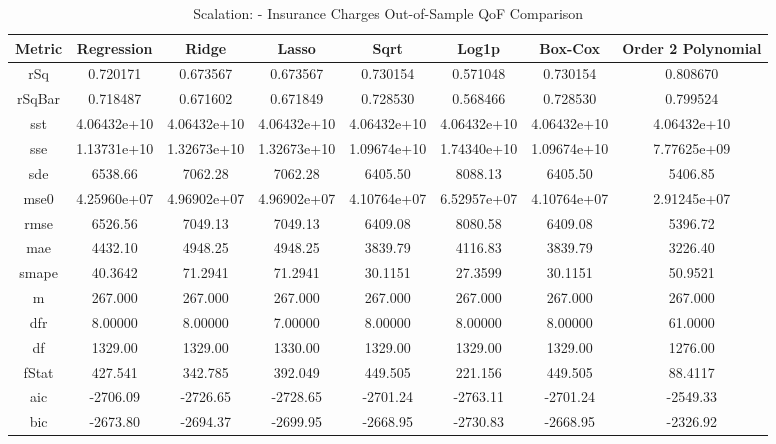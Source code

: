 \documentclass{article}
\begin{document}
\begin{table}[H]
\centering
\caption{Scalation: - Insurance Charges Out-of-Sample QoF Comparison}
\label{tab:Scalation: - Insurance Charges Out-of-Sample QoF Comparison}
\begin{tabular}{|c|c|c|c|c|c|c|c|} \hline 
Metric & Regression & Ridge & Lasso & Sqrt & Log1p & Box-Cox & Order 2 Polynomial \\ \hline \hline 
rSq &0.720171 & 0.673567 &      0.673567 &      0.730154 &      0.571048 &      0.730154 &      0.808670 \\ \hline 
rSqBar &0.718487 &      0.671602 &      0.671849 &      0.728530 &      0.568466 &      0.728530 &      0.799524 \\ \hline 
sst &4.06432e+10 &      4.06432e+10 &   4.06432e+10 &   4.06432e+10 &   4.06432e+10 &   4.06432e+10 &   4.06432e+10 \\ \hline 
sse &1.13731e+10 &      1.32673e+10 &   1.32673e+10 &   1.09674e+10 &   1.74340e+10 &   1.09674e+10 &   7.77625e+09 \\ \hline 
sde &6538.66 &  7062.28 &       7062.28 &       6405.50 &       8088.13 &       6405.50 &       5406.85 \\ \hline 
mse0 &4.25960e+07 &     4.96902e+07 &   4.96902e+07 &   4.10764e+07 &   6.52957e+07 &   4.10764e+07 &   2.91245e+07 \\ \hline 
rmse &6526.56 & 7049.13 &       7049.13 &       6409.08 &       8080.58 &       6409.08 &       5396.72 \\ \hline 
mae &4432.10 &  4948.25 &       4948.25 &       3839.79 &       4116.83 &       3839.79 &       3226.40 \\ \hline 
smape &40.3642 &        71.2941 &       71.2941 &       30.1151 &       27.3599 &       30.1151 &       50.9521 \\ \hline 
m &267.000 &    267.000 &       267.000 &       267.000 &       267.000 &       267.000 &       267.000 \\ \hline 
dfr &8.00000 &  8.00000 &       7.00000 &       8.00000 &       8.00000 &       8.00000 &       61.0000 \\ \hline 
df &1329.00 &   1329.00 &       1330.00 &       1329.00 &       1329.00 &       1329.00 &       1276.00 \\ \hline 
fStat &427.541 &        342.785 &       392.049 &       449.505 &       221.156 &       449.505 &       88.4117 \\ \hline 
aic &-2706.09 & -2726.65 &      -2728.65 &      -2701.24 &      -2763.11 &      -2701.24 &      -2549.33 \\ \hline 
bic &-2673.80 & -2694.37 &      -2699.95 &      -2668.95 &      -2730.83 &      -2668.95 &      -2326.92 \\ \hline 
\end{tabular}
\end{table}
\end{document}
